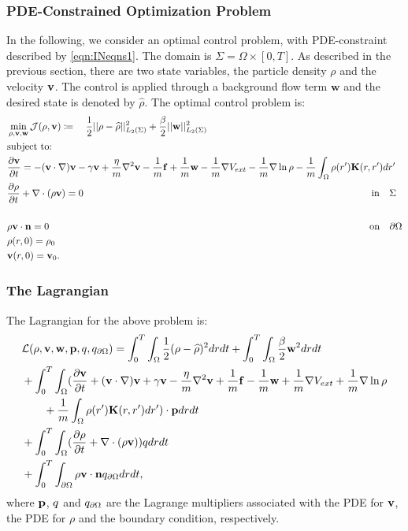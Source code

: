 
\subsubsection{PDE-Constrained Optimization Problem}
In the following, we consider an optimal control problem, with PDE-constraint described by \eqref{eqn:INeqns1}. 
The domain is $\Sigma=\Omega \times [0,T]$. As described in the previous section, there are two state variables, the particle density $\rho$ and the velocity $\mathbf{v}$. The control is applied through a background flow term $\mathbf{w}$ and the desired state is denoted by $\widehat \rho$. The optimal control problem is:
\begin{align*}
&\min_{\rho,\mathbf{v},\mathbf{w} } \mathcal J(\rho,\mathbf{v}) \coloneqq \quad \frac{1}{2}||\rho - \widehat \rho||_{L_2(\Sigma)}^2  +\frac{\beta}{2}||\mathbf{w}||_{L_2(\Sigma)}^2\\
&\text{subject to:}\\
& \frac{\partial \mathbf{v}}{\partial t}= -  (\mathbf{v} \cdot \nabla)\mathbf{v} - \gamma  \mathbf{v} + \frac{\eta}{m} \nabla^2 \mathbf{v}  -\frac{1}{m}\mathbf{f} +\frac{1}{m}\mathbf{w} -\frac{1}{m} \nabla V_{ext} - \frac{1}{m}\nabla \ln \rho  -\frac{1}{m}\int_\Omega \rho(r') \mathbf{K}(r,r')dr' \\
&\frac{\partial \rho}{\partial t} + \nabla \cdot (\rho \mathbf{v})=0 \qquad\qquad \qquad\qquad\qquad\quad \quad\quad\qquad \qquad\qquad \qquad\qquad\qquad\quad \qquad\quad\ \ \text{in} \quad \Sigma\\
\\
&\rho \mathbf{v} \cdot \mathbf{n} =0\qquad\qquad \qquad\qquad\qquad\qquad\qquad\qquad\qquad \qquad\qquad \qquad\qquad\qquad \qquad\qquad\quad  \text{on} \quad \partial  \Omega\\
& \rho(r,0)=\rho_0\\
& \mathbf{v}(r,0)=\mathbf{v}_0.
\end{align*}

\subsubsection*{The Lagrangian}
The Lagrangian for the above problem is:
\begin{align*}
&\mathcal{L}(\rho,\mathbf{v},\mathbf{w},\mathbf{p},q,{q}_{\partial \Omega}) = \int_0^T \int_\Omega  \frac{1}{2}(\rho - \widehat \rho)^2 drdt  +\int_0^T \int_\Omega  \frac{\beta}{2}\mathbf{w}^2 drdt\\
&+ \int_0^T \int_\Omega (\frac{\partial \mathbf{v}}{\partial t}+  (\mathbf{v} \cdot \nabla)\mathbf{v} + \gamma  \mathbf{v} - \frac{\eta}{m} \nabla^2 \mathbf{v}  +\frac{1}{m}\mathbf{f} -\frac{1}{m}\mathbf{w} +\frac{1}{m} \nabla V_{ext} + \frac{1}{m}\nabla \ln \rho  \\
&\quad \quad +\frac{1}{m}\int_\Omega \rho(r') \mathbf{K}(r,r')dr') \cdot \mathbf{p} dr dt\\
& + \int_0^T \int_\Omega (\frac{\partial \rho}{\partial t} + \nabla \cdot (\rho \mathbf{v})) q dr dt\\ 
& +\int_0^T \int_{\partial\Omega} \rho \mathbf{v} \cdot \mathbf{n} {q}_{\partial \Omega} dr dt,
\end{align*}
where $\mathbf{p}$, $q$ and ${q}_{\partial \Omega}$ are the Lagrange multipliers associated with the PDE for $\mathbf{v}$, the PDE for $\rho$ and the boundary condition, respectively.


